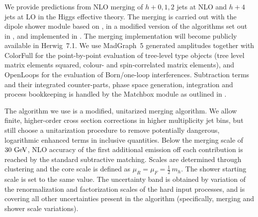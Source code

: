 \subsubsection{\Herwig}
\label{sec:hjetscomp:tools:mc:herwig}

We provide predictions from NLO merging of $h+0,1,2$ jets at NLO and $h+4$
jets at LO in the Higgs effective theory. The merging is carried out with the
\Herwig \ \cite{Bellm:2015jjp} dipole shower module based on
\cite{Platzer:2009jq,Platzer:2011bc}, in a modified version of the algorithms
set out in \cite{Platzer:2012bs,Lonnblad:2012ix}, and implemented in
\cite{Bellm:thesis,Bellm:2016xxx}. The merging implementation will become
publicly available in \textsf{Herwig~7.1}. We use \textsf{MadGraph~5}
\cite{Alwall:2011uj} generated amplitudes together with \textsf{ColorFull}
\cite{Sjodahl:2014opa} for the point-by-point evaluation of tree-level type
objects (tree level matrix elements squared, colour- and spin-correlated
matrix elements), and \textsf{OpenLoops} \cite{Cascioli:2011va} for the
evaluation of Born/one-loop interferences.  Subtraction terms and their
integrated counter-parts, phase space generation, integration and process
bookkeeping is handled by the \textsf{Matchbox} module as outlined in
\cite{Bellm:2015jjp}.

The algorithm we use is a modified, unitarized merging algorithm. We allow
finite, higher-order cross section corrections in higher multiplicity jet
bins, but still choose a unitarization procedure to remove potentially
dangerous, logarithmic enhanced terms in inclusive quantities. Below the
merging scale of $30\ {\rm GeV}$, NLO accuracy of the first additional
emission off each contribution is reached by the standard subtractive
matching. Scales are determined through clustering and the core scale 
is defined as $\mu_R=\mu_F=\tfrac{1}{2}\,m_h$. The shower starting scale 
is set to the same value. The uncertainty band is obtained by variation of 
the renormalization and factorization scales of the hard input processes, 
and is covering all other uncertainties present in the algorithm 
(specifically, merging and shower scale variations).
